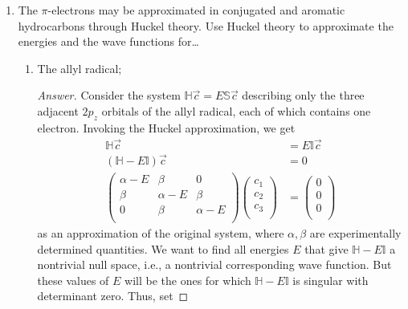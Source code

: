 \documentclass[../psets.tex]{subfiles}
\begin{document}
\begin{enumerate}
\begin{enumerate}
\begin{proof}[Answer]
        \end{proof}
        \item By symmetry, should the results in parts (a) and (b) be the same or different?
        \begin{proof}[Answer]
            .
        \end{proof}
    \end{enumerate}
    \item The $\pi$-electrons may be approximated in conjugated and aromatic hydrocarbons through Huckel theory. Use Huckel theory to approximate the energies and the wave functions for\dots
    \begin{enumerate}
        \item The allyl radical;
        \begin{proof}[Answer]
            Consider the system $\mathbb{H}\vec{c}=E\mathbb{S}\vec{c}$ describing only the three adjacent $2p_z$ orbitals of the allyl radical, each of which contains one electron. Invoking the Huckel approximation, we get
            \begin{align*}
                \mathbb{H}\vec{c} &= E\mathbb{I}\vec{c}\\
                (\mathbb{H}-E\mathbb{I})\vec{c} &= 0\\
                \begin{pmatrix}
                    \alpha-E & \beta & 0\\
                    \beta & \alpha-E & \beta\\
                    0 & \beta & \alpha-E\\
                \end{pmatrix}
                \begin{pmatrix}
                    c_1\\
                    c_2\\
                    c_3\\
                \end{pmatrix}
                &=
                \begin{pmatrix}
                    0\\
                    0\\
                    0\\
                \end{pmatrix}
            \end{align*}
            as an approximation of the original system, where $\alpha,\beta$ are experimentally determined quantities. We want to find all energies $E$ that give $\mathbb{H}-E\mathbb{I}$ a nontrivial null space, i.e., a nontrivial corresponding wave function. But these values of $E$ will be the ones for which $\mathbb{H}-E\mathbb{I}$ is singular with determinant zero. Thus, set

\end{proof}
\end{enumerate}
\end{enumerate}
\end{document}
